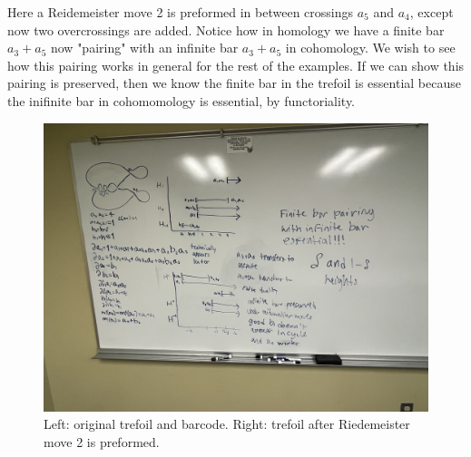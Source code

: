 \documentclass[General-Information/Most_recent_log(3_0).tex]{subfiles}
\begin{document}
\begin{example}
    \label{ex:2}
    Here a Reidemeister move 2 is preformed in between crossings $a_5$ and $a_4$, except now two overcrossings are added. Notice how in homology we have a finite bar $a_3+a_5$ now "pairing" with an infinite bar $a_3+a_5$ in cohomology. We wish to see how this pairing works in general for the rest of the examples. If we can show this pairing is preserved, then we know the finite bar in the trefoil is essential because the inifinite bar in cohomomology is essential, by functoriality.
    \begin{figure}[H]
        \centering
        \includegraphics[width=\textwidth]{General-Information/Pictures/Examples/IMG-2751.JPG}
        \caption{Left: original trefoil and barcode. Right: trefoil after Riedemeister move 2 is preformed.}
    \end{figure}
\end{example}
\end{document}
